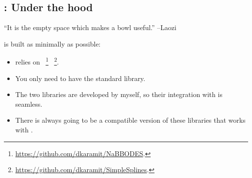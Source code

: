 \documentclass[10pt,utf8,compress,xcolor=dvipsnames]{beamer}
\begin{document}
\subsection{\mimes: Under the hood}
\begin{frame}{\insertsubsectionhead}
	\begin{center}
		``It is the empty space which makes a bowl useful.''
		\flushright --Laozi %
	\end{center}
	\mimes is built as minimally as possible:
	\\[0.3cm] 
	\begin{itemize}
		\item \mimes relies on ~\footnote{\fontF \href{https://github.com/dkaramit/NaBBODES}{https://github.com/dkaramit/NaBBODES}.} ~\footnote{\fontF \href{https://github.com/dkaramit/SimpleSplines}{https://github.com/dkaramit/SimpleSplines}.}.
		\item You only need to have the standard \CPP library.
		\item The two libraries are developed by myself, so their integration with \mimes is seamless.
		\item There is always going to be a compatible version of these libraries that works with \mimes.\\[0.3cm]
	\end{itemize}	
		
\end{frame}
\end{document}
